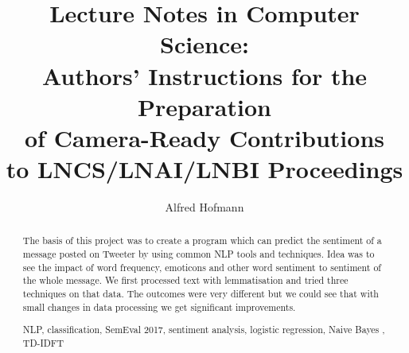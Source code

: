 \documentclass[runningheads,a4paper]{llncs}
\newcommand{\keywords}[1]{\par\addvspace\baselineskip
\noindent\keywordname\enspace\ignorespaces#1}
\begin{document}
\mainmatter  %

\title{Lecture Notes in Computer Science:\\Authors' Instructions
for the Preparation\\of Camera-Ready
Contributions\\to LNCS/LNAI/LNBI Proceedings}


%
%
\author{Alfred Hofmann}%

%


%
%

\maketitle


\begin{abstract}
The basis of this project was to create a program which can predict the sentiment of a message posted on Tweeter by using common NLP tools and techniques. Idea was to see the impact of word frequency, emoticons and other word sentiment to sentiment of the whole message. We first processed text with lemmatisation and tried three techniques on that data. The outcomes were very different but we could see that with small changes in data processing we get significant improvements.
\keywords{NLP, classification, SemEval 2017, sentiment analysis, logistic regression, Naive Bayes , TD-IDFT}
\end{abstract}
\end{document}
